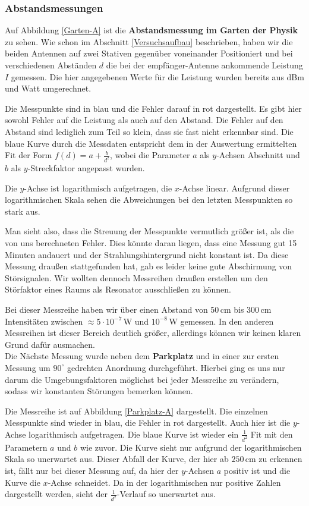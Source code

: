 \documentclass[titlepage,11pt,a4paper,ngerman]{article}
\newcommand{\tx}[1]{\textrm{#1}}
\begin{document}
\subsubsection{Abstandsmessungen}

Auf Abbildung \ref{Garten-A} ist die \textbf{Abstandsmessung im Garten der Physik} zu sehen. Wie schon im Abschnitt \ref{Versuchsaufbau} beschrieben, haben wir die beiden Antennen auf zwei Stativen gegenüber voneinander Positioniert und bei verschiedenen Abständen $ d $ die bei der empfänger-Antenne ankommende Leistung $ I $ gemessen. Die hier angegebenen Werte für die Leistung wurden bereits aus dBm und Watt umgerechnet.\par
Die Messpunkte sind in blau und die Fehler darauf in rot dargestellt. Es gibt hier sowohl Fehler auf die Leistung als auch auf den Abstand. Die Fehler auf den Abstand sind lediglich zum Teil so klein, dass sie fast nicht erkennbar sind. Die blaue Kurve durch die Messdaten entspricht dem in der Auswertung ermittelten Fit der Form $ f(d) = a + \frac{b}{d^2} $, wobei die Parameter $ a $ als $ y $-Achsen Abschnitt und $ b $ als $ y $-Streckfaktor angepasst wurden.\par
Die $ y $-Achse ist logarithmisch aufgetragen, die $ x $-Achse linear. Aufgrund dieser logarithmischen Skala sehen die Abweichungen bei den letzten Messpunkten so stark aus.\par
Man sieht also, dass die Streuung der Messpunkte vermutlich größer ist, als die von uns berechneten Fehler. Dies könnte daran liegen, dass eine Messung gut 15 Minuten andauert und der Strahlungshintergrund nicht konstant ist. Da diese Messung draußen stattgefunden hat, gab es leider keine gute Abschirmung von Störsignalen. Wir wollten dennoch Messreihen draußen erstellen um den Störfaktor eines Raums als Resonator ausschließen zu können.\par
Bei dieser Messreihe haben wir über einen Abstand von 50\,cm bis 300\,cm Intensitäten zwischen $ \approx 5 \cdot 10^{-7} \, \tx{W} $ und $ 10^{-8} \, \tx{W} $ gemessen. In den anderen Messreihen ist dieser Bereich deutlich größer, allerdings können wir keinen klaren Grund dafür ausmachen.\\[10pt]
\noindent
Die Nächste Messung wurde neben dem \textbf{Parkplatz} und in einer zur ersten Messung um $ 90^\circ $ gedrehten Anordnung durchgeführt. Hierbei ging es uns nur darum die Umgebungsfaktoren möglichst bei jeder Messreihe zu verändern, sodass wir konstanten Störungen bemerken können.\par
Die Messreihe ist auf Abbildung \ref{Parkplatz-A} dargestellt. Die einzelnen Messpunkte sind wieder in blau, die Fehler in rot dargestellt. Auch hier ist die $ y $-Achse logarithmisch aufgetragen. Die blaue Kurve ist wieder ein $ \frac{1}{d^2} $ Fit mit den Parametern $ a $ und $ b $ wie zuvor. Die Kurve sieht nur aufgrund der logarithmischen Skala so unerwartet aus. Dieser Abfall der Kurve, der hier ab $ 250 \, \tx{cm} $ zu erkennen ist, fällt nur bei dieser Messung auf, da hier der $ y $-Achsen $ a $ positiv ist und die Kurve die $ x $-Achse schneidet. Da in der logarithmischen nur positive Zahlen dargestellt werden, sieht der $ \frac{1}{d^2} $-Verlauf so unerwartet aus.\par
\end{document}
